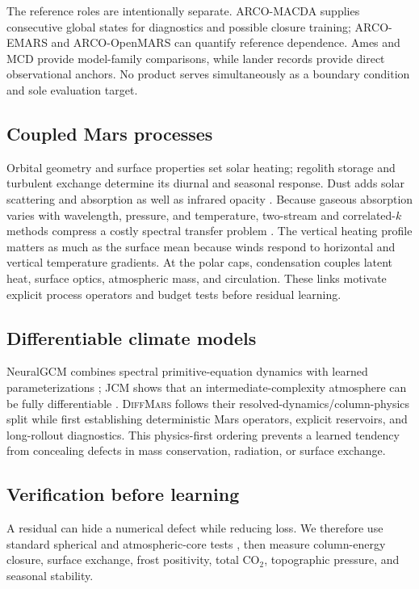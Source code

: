 \documentclass{article}
\newcommand{\model}{\textsc{DiffMars}}
\begin{document}
The reference roles are intentionally separate. ARCO-MACDA supplies consecutive
global states for diagnostics and possible closure training; ARCO-EMARS and
ARCO-OpenMARS can quantify reference dependence. Ames and MCD provide
model-family comparisons, while lander records provide direct observational
anchors. No product serves simultaneously as a boundary condition and sole
evaluation target.

\subsection{Coupled Mars processes}
Orbital geometry and surface properties set solar heating; regolith storage and
turbulent exchange determine its diurnal and seasonal response. Dust adds solar
scattering and absorption as well as infrared opacity
\citep{madeleine2011dust}. Because gaseous absorption varies with wavelength,
pressure, and temperature, two-stream and correlated-\(k\) methods compress a
costly spectral transfer problem \citep{toon1989twostream}. The vertical heating
profile matters as much as the surface mean because winds respond to horizontal
and vertical temperature gradients. At the polar caps, condensation couples
latent heat, surface optics, atmospheric mass, and circulation. These links
motivate explicit process operators and budget tests before residual learning.

\subsection{Differentiable climate models}
NeuralGCM combines spectral primitive-equation dynamics with learned
parameterizations \citep{kochkov2024neuralgcm}; JCM shows that an
intermediate-complexity atmosphere can be fully differentiable
\citep{davenport2026jcm}. \model{} follows their resolved-dynamics/column-physics
split while first establishing deterministic Mars operators, explicit
reservoirs, and long-rollout diagnostics. This physics-first ordering prevents
a learned tendency from concealing defects in mass conservation, radiation, or
surface exchange.

\subsection{Verification before learning}
A residual can hide a numerical defect while reducing loss. We therefore use
standard spherical and atmospheric-core tests
\citep{williamson1992standard,held1994proposal,jablonowski2006baroclinic}, then
measure column-energy closure, surface exchange, frost positivity, total
\(\mathrm{CO_2}\), topographic pressure, and seasonal stability.
\end{document}
